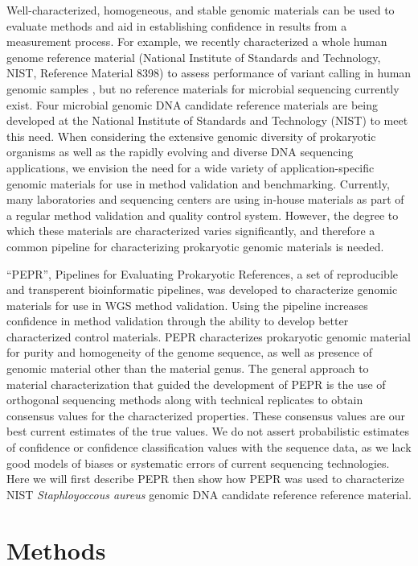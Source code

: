 \documentclass[smallextended]{svjour3}\usepackage[]{graphicx}\usepackage[]{color}
\begin{document}
Well-characterized, homogeneous, and stable genomic materials can be used to evaluate methods and aid in establishing confidence in results from a measurement process. 
For example, we recently characterized a whole human genome reference material (National Institute of Standards and Technology, NIST, Reference Material 8398) to assess performance of variant calling in human genomic samples \cite{Zook2014}, but no reference materials for microbial sequencing currently exist. 
Four microbial genomic DNA candidate reference materials are being developed at the National Institute of Standards and Technology (NIST) to meet this need. 
When considering the extensive genomic diversity of prokaryotic organisms as well as the rapidly evolving and diverse DNA sequencing applications, we envision the need for a wide variety of application-specific genomic materials for use in method validation and benchmarking. 
Currently, many laboratories and sequencing centers are using in-house materials as part of a regular method validation and quality control system. 
However, the degree to which these materials are characterized varies significantly, and therefore a common pipeline for characterizing prokaryotic genomic materials is needed.  


“PEPR”, Pipelines for Evaluating Prokaryotic References, a set of reproducible and transperent bioinformatic pipelines, was developed to characterize genomic materials for use in WGS method validation. 
Using the pipeline increases confidence in method validation through the ability to develop better characterized control materials. 
PEPR characterizes prokaryotic genomic material for purity and homogeneity of the genome sequence, as well as presence of genomic material other than the material genus. 
The general approach to material characterization that guided the development of PEPR is the use of orthogonal sequencing methods along with technical replicates to obtain consensus values for the characterized properties. 
These consensus values are our best current estimates of the true values. 
We do not assert probabilistic estimates of confidence or confidence classification values with the sequence data, as we lack good models of biases or systematic errors of current sequencing technologies. 
Here we will first describe PEPR then show how PEPR was used to characterize NIST \textit{Staphloyoccous aureus} genomic DNA candidate reference reference material.



\section{Methods}
\end{document}

